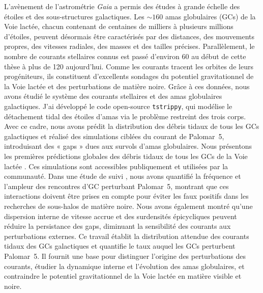 L'avènement de l'astrométrie \textit{Gaia} a permis des études à grande échelle des étoiles et des sous-structures galactiques. Les $\sim 160$ amas globulaires (GCs) de la Voie lactée, chacun contenant de centaines de milliers à plusieurs millions d'étoiles, peuvent désormais être caractérisés par des distances, des mouvements propres, des vitesses radiales, des masses et des tailles précises. Parallèlement, le nombre de courants stellaires connus est passé d'environ 60 au début de cette thèse à plus de 120 aujourd'hui. Comme les courants tracent les orbites de leurs progéniteurs, ils constituent d'excellents sondages du potentiel gravitationnel de la Voie lactée et des perturbations de matière noire. Grâce à ces données, nous avons étudié le système des courants stellaires et des amas globulaires galactiques. J'ai développé le code open-source \texttt{tstrippy}, qui modélise le détachement tidal des étoiles d'amas via le problème restreint des trois corps. Avec ce cadre, nous avons prédit la distribution des débris tidaux de tous les GCs galactiques et réalisé des simulations ciblées du courant de Palomar~5, introduisant des « gaps » dues aux survols d'amas globulaires. Nous présentons les premières prédictions globales des débris tidaux de tous les GCs de la Voie lactée \citep{2023A&A...673A..44F}. Ces simulations sont accessibles publiquement et utilisées par la communauté. Dans une étude de suivi \citep{2025A&A...699A.289F}, nous avons quantifié la fréquence et l'ampleur des rencontres d'GC perturbant Palomar~5, montrant que ces interactions doivent être prises en compte pour éviter les faux positifs dans les recherches de sous-halos de matière noire. Nous avons également montré qu'une dispersion interne de vitesse accrue et des surdensités épicycliques peuvent réduire la persistance des gaps, diminuant la sensibilité des courants aux perturbations externes. Ce travail établit la distribution attendue des courants tidaux des GCs galactiques et quantifie le taux auquel les GCs perturbent Palomar~5. Il fournit une base pour distinguer l'origine des perturbations des courants, étudier la dynamique interne et l'évolution des amas globulaires, et contraindre le potentiel gravitationnel de la Voie lactée en matière visible et noire.
